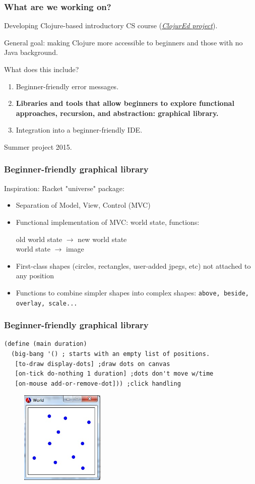 \documentclass{beamer}
\begin{document}
\begin{frame}
\frametitle{What are we working on?}
Developing Clojure-based introductory CS course ({\it \href{http://cda.morris.umn.edu/~elenam/\#clojure}{ClojurEd project}}). 

General goal: making Clojure more accessible to beginners and those with no Java background. 

What does this include? 
\begin{enumerate}
\item Beginner-friendly error messages. 
\item {\bf Libraries and tools that allow beginners to explore functional approaches, recursion, and abstraction: graphical library.}
\item Integration into a beginner-friendly IDE. 
\end{enumerate}
Summer project 2015. 
\end{frame}

\begin{frame}
\frametitle{Beginner-friendly graphical library}
Inspiration: Racket "universe" package:
\begin{itemize}
\item Separation of Model, View, Control (MVC) 
\item Functional implementation of MVC: world state, functions: 

\noindent
old world state $\rightarrow$ new world state \\
world state $\rightarrow$ image 
\item  First-class shapes (circles, rectangles, user-added jpegs, etc) not attached to any position
\item Functions to combine simpler shapes into complex shapes: {\tt above, beside, overlay, scale...}
\end{itemize}
\end{frame}

\begin{frame}[fragile]
\frametitle{Beginner-friendly graphical library}
\begin{verbatim}
(define (main duration)
  (big-bang '() ; starts with an empty list of positions.
   [to-draw display-dots] ;draw dots on canvas
   [on-tick do-nothing 1 duration] ;dots don't move w/time
   [on-mouse add-or-remove-dot])) ;click handling
\end{verbatim}
\begin{figure}[h]
\includegraphics[width=4cm]{PresentationImages/dots.jpg}
\end{figure}
\end{frame}
\end{document}
